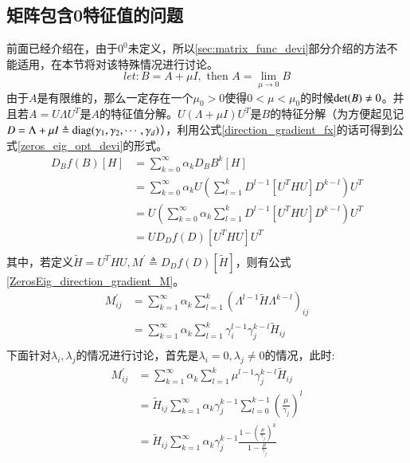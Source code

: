 \subsection{矩阵包含0特征值的问题}
\label{sec:With_Zeros_Eigenvalue}
前面已经介绍在，由于$0^{0}$未定义，所以\ref{sec:matrix_func_devi}部分介绍的方法不能适用，在本节将对该特殊情况进行讨论。
\begin{equation}
\label{zeros_eig_opt_normalization}
let:B=A+\mu I,\text{ then } A=\lim_{\mu \rightarrow 0}B
\end{equation}
由于$A$是有限维的，那么一定存在一个$\mu_0>0$使得$0<\mu<\mu_0$的时候${\rm det}(B)\neq 0$。并且若$A=U\Lambda U^{T}$是$A$的特征值分解。$U(\Lambda+\mu I) U^{T}$是$B$的特征分解（为方便起见记$D=\Lambda+\mu I \triangleq {\rm diag}(\gamma_1,\gamma_2,\cdots,\gamma_d)$），利用公式\ref{direction_gradient_fx}的话可得到公式\ref{zeros_eig_opt_devi}的形式。
\begin{equation}
\label{zeros_eig_opt_devi}
\begin{split}
D_{B}f(B)[H]&=\sum_{k=0}^{\infty}\alpha_{k}D_{B}B^{k}[H]\\
&=\sum_{k=0}^{\infty}\alpha_{k}U\left(\sum_{l=1}^{k}D^{l-1}[U^{T}HU]D^{k-l}\right)U^{T}\\
&=U\left(\sum_{k=0}^{\infty}\alpha_{k}\sum_{l=1}^{k}D^{l-1}[U^{T}HU]D^{k-l}\right)U^{T}\\
&=UD_{D}f(D)[U^{T}HU]U^{T}\\
\end{split}
\end{equation}
其中，若定义$\tilde{H}=U^{T}HU,M^{\prime}\triangleq D_{D}f(D)[\tilde{H}]$，则有公式\ref{ZerosEig_direction_gradient_M}。
\begin{equation}
\label{ZerosEig_direction_gradient_M}
\begin{split}
M_{ij}^{\prime}&=\sum_{k=1}^{\infty} \alpha_{k}\sum_{l=1}^{k}(\Lambda^{l-1}\tilde{H}\Lambda^{k-l})_{ij}\\
&=\sum_{k=1}^{\infty} \alpha_{k}\sum_{l=1}^{k}\gamma_{i}^{l-1}\gamma_{j}^{k-l}\tilde{H}_{ij}\\
\end{split}
\end{equation}
下面针对$\lambda_i,\lambda_j$的情况进行讨论，首先是$\lambda_i=0,\lambda_j\neq 0$的情况，此时:
\begin{equation}
\label{ZerosEig_direction_gradient_M_1}
\begin{split}
M_{ij}^{\prime}&=\sum_{k=1}^{\infty} \alpha_{k}\sum_{l=1}^{k}\mu^{l-1}\gamma_{j}^{k-l}\tilde{H}_{ij}\\
&=\tilde{H}_{ij}\sum_{k=1}^{\infty}\alpha_{k}\gamma_{j}^{k-1}\sum_{l=0}^{k-1}\left(\frac{\mu}{\gamma_j}\right)^{l}\\
&=\tilde{H}_{ij}\sum_{k=1}^{\infty}\alpha_{k}\gamma_{j}^{k-1}\frac{1-\left(\frac{\mu}{\gamma_{j}}\right)^{k}}{1-\frac{\mu}{\gamma_{j}}}\\
\end{split}
\end{equation}
